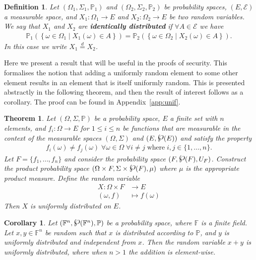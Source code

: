 \documentclass{article}
\newcommand{\eqd}[0]{\stackrel{d}{=}}
\newcommand{\powerset}{\raisebox{.15\baselineskip}{\Large\ensuremath{\wp}}}
\newcommand{\set}[2]{\left\{ #1 \middle| #2 \right\}}
\newtheorem{theorem}{Theorem}
\newtheorem{corollary}{Corollary}
\newtheorem{definition}{Definition}
\theoremstyle{remark}
\newcommand{\F}{\mathbb{F}}
\renewcommand{\P}{\mathbb{P}}
\begin{document}
\begin{definition}
	Let $(\Omega_1, \Sigma_1, \P_1)$ and $(\Omega_2, \Sigma_2, \P_2)$ be
	probability spaces, $(E, \mathcal{E})$ a measurable space, and $X_1:
	\Omega_1 \to E$ and $X_2: \Omega_2 \to E$ be two random variables. We say
	that $X_1$ and $X_2$ are \textbf{identically distributed} if $\forall A \in
	\mathcal{E}$ we have
	\begin{align*}
		\P_1\left(\set{\omega \in \Omega_1}{X_1(\omega) \in A}\right) =
		\P_2\left(\set{\omega \in \Omega_2}{X_2(\omega) \in A}\right).
	\end{align*}
	In this case we write $X_1 \eqd X_2$.
\end{definition}

Here we present a result that will be useful in the proofs of security. This
formalises the notion that adding a uniformly random element to some other
element results in an element that is itself uniformly random. This is
presented abstractly in the following theorem, and then the result of interest
follows as a corollary. The proof can be found in Appendix~\ref{app:unif}.

\begin{theorem}\label{thm:unif}
	Let $(\Omega, \Sigma, \P)$ be a probability space, $E$ a finite set with
	$n$ elements, and $f_i: \Omega \to E$ for $1 \le i \le n$ be functions that
	are measurable in the context of the measurable spaces $(\Omega, \Sigma)$
	and $(E, \powerset(E))$ and satisfy the property
	\begin{align*}
		f_i(\omega) \ne f_j(\omega)
		\; \forall \omega \in \Omega
		\; \forall i \ne j\;\text{where}\;i, j \in \{1, \ldots, n\}.
	\end{align*}
	Let $F = \{f_1, \ldots, f_n\}$ and consider the probability space $(F,
	\powerset(F), U_F)$. Construct the product probability space $(\Omega
	\times F, \Sigma \times \powerset(F), \mu)$ where $\mu$ is the appropriate
	product measure. Define the random variable
	\begin{align*}
		X: \Omega \times F &\to E\\
		(\omega, f) &\mapsto f(\omega)
	\end{align*}
	Then $X$ is uniformly distributed on $E$.
\end{theorem}

\begin{corollary}\label{cor:unif}
	Let $(\F^n, \powerset(\F^n), \P)$ be a probability space, where $\F$ is a
	finite field. Let $x, y \in \F^n$ be random such that $x$ is distributed
	according to $\P$, and $y$ is uniformly distributed and independent from
	$x$. Then the random variable $x + y$ is uniformly distributed, where when
	$n > 1$ the addition is element-wise.
\end{corollary}
\end{document}

